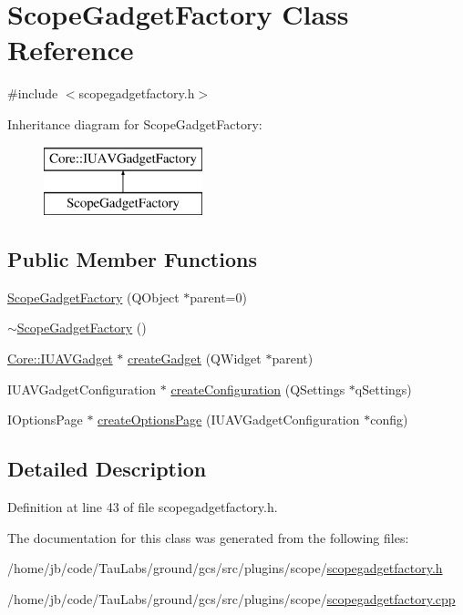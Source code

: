 \hypertarget{class_scope_gadget_factory}{\section{\-Scope\-Gadget\-Factory \-Class \-Reference}
\label{class_scope_gadget_factory}
}


{\ttfamily \#include $<$scopegadgetfactory.\-h$>$}

\-Inheritance diagram for \-Scope\-Gadget\-Factory\-:\begin{figure}[H]
\begin{center}
\leavevmode
\includegraphics[height=2.000000cm]{class_scope_gadget_factory}
\end{center}
\end{figure}
\subsection*{\-Public \-Member \-Functions}
\begin{DoxyCompactItemize}
\item 
\hyperlink{group___scope_plugin_gace4d87876bb88a527c473e6f363a4a60}{\-Scope\-Gadget\-Factory} (\-Q\-Object $\ast$parent=0)
\item 
\hyperlink{group___scope_plugin_gae7d925002f23646412ea50bf0a6c1658}{$\sim$\-Scope\-Gadget\-Factory} ()
\item 
\hyperlink{class_core_1_1_i_u_a_v_gadget}{\-Core\-::\-I\-U\-A\-V\-Gadget} $\ast$ \hyperlink{group___scope_plugin_ga38da87ae88b0f1bd3ae63e997528ed56}{create\-Gadget} (\-Q\-Widget $\ast$parent)
\item 
\-I\-U\-A\-V\-Gadget\-Configuration $\ast$ \hyperlink{group___scope_plugin_gacbb08116cc0c7390601e30b6cfde0cba}{create\-Configuration} (\-Q\-Settings $\ast$q\-Settings)
\item 
\-I\-Options\-Page $\ast$ \hyperlink{group___scope_plugin_ga121b0d9857a168a0ad41f980d5c34b63}{create\-Options\-Page} (\-I\-U\-A\-V\-Gadget\-Configuration $\ast$config)
\end{DoxyCompactItemize}


\subsection{\-Detailed \-Description}


\-Definition at line 43 of file scopegadgetfactory.\-h.



\-The documentation for this class was generated from the following files\-:\begin{DoxyCompactItemize}
\item 
/home/jb/code/\-Tau\-Labs/ground/gcs/src/plugins/scope/\hyperlink{scopegadgetfactory_8h}{scopegadgetfactory.\-h}\item 
/home/jb/code/\-Tau\-Labs/ground/gcs/src/plugins/scope/\hyperlink{scopegadgetfactory_8cpp}{scopegadgetfactory.\-cpp}\end{DoxyCompactItemize}
